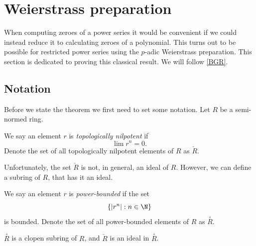 \chapter{Weierstrass preparation}


When computing zeroes of a power series it would be convenient if we could instead reduce it to
calculating zeroes of a polynomial. This turns out to be possible for restricted power series using
the $p$-adic Weierstrass preparation. This section is dedicated to proving this classical result. We
will follow \ref{BGR}.

\newcommand{\pb}[1]{\overset{\circ}{#1}}
\newcommand{\tn}[1]{\check{#1}}
\newcommand{\res}[1]{\widetilde{#1}}
\newcommand{\quot}[2]{{\raisebox{.2em}{$#1$}\left/\raisebox{-.2em}{$#2$}\right.}}

\section{Notation}

Before we state the theorem we first need to set some notation. Let $R$ be a semi-normed ring.

\begin{definition}
  We say an element $r$ is \emph{topologically nilpotent} if
    \[
     \lim r^n = 0.
    \]
    Denote the set of all topologically nilpotent elements of $R$ as $\tn{R}$.
\end{definition}

Unfortunately, the set $\tn{R}$ is not, in general, an ideal of $R$. However, we can define a
subring of $R$, that has it an ideal.

\begin{definition}
  We say an element $r$ is \emph{power-bounded} if the set
  \[
  \left\{ \lvert r^n \rvert : n \in \N \right\}
  \]
  is bounded.
  Denote the set of all power-bounded elements of $R$ as $\pb{R}$.
\end{definition}

\begin{lemma}
  $\pb{R}$ is a clopen subring of $R$, and $\tn{R}$ is an ideal in $\pb{R}$.
\end{lemma}


